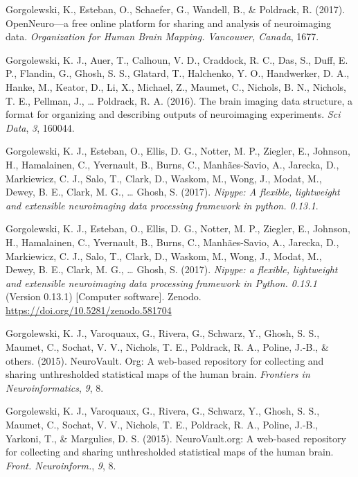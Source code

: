\documentclass[11pt,american,a4paper,oneside,]{memoir} %
\begin{document}
\leavevmode\hypertarget{ref-Gorgolewski2017-uu}{}%
Gorgolewski, K., Esteban, O., Schaefer, G., Wandell, B., \& Poldrack, R. (2017). OpenNeuro---a free online platform for sharing and analysis of neuroimaging data. \emph{Organization for Human Brain Mapping. Vancouver, Canada}, 1677.

\leavevmode\hypertarget{ref-Gorgolewski2016-in}{}%
Gorgolewski, K. J., Auer, T., Calhoun, V. D., Craddock, R. C., Das, S., Duff, E. P., Flandin, G., Ghosh, S. S., Glatard, T., Halchenko, Y. O., Handwerker, D. A., Hanke, M., Keator, D., Li, X., Michael, Z., Maumet, C., Nichols, B. N., Nichols, T. E., Pellman, J., \ldots{} Poldrack, R. A. (2016). The brain imaging data structure, a format for organizing and describing outputs of neuroimaging experiments. \emph{Sci Data}, \emph{3}, 160044.

\leavevmode\hypertarget{ref-Gorgolewski2017-gb}{}%
Gorgolewski, K. J., Esteban, O., Ellis, D. G., Notter, M. P., Ziegler, E., Johnson, H., Hamalainen, C., Yvernault, B., Burns, C., Manhães-Savio, A., Jarecka, D., Markiewicz, C. J., Salo, T., Clark, D., Waskom, M., Wong, J., Modat, M., Dewey, B. E., Clark, M. G., \ldots{} Ghosh, S. (2017). \emph{Nipype: A flexible, lightweight and extensible neuroimaging data processing framework in python. 0.13.1}.

\leavevmode\hypertarget{ref-gorgolewski_krzysztof_j_2017_581704}{}%
Gorgolewski, K. J., Esteban, O., Ellis, D. G., Notter, M. P., Ziegler, E., Johnson, H., Hamalainen, C., Yvernault, B., Burns, C., Manhães-Savio, A., Jarecka, D., Markiewicz, C. J., Salo, T., Clark, D., Waskom, M., Wong, J., Modat, M., Dewey, B. E., Clark, M. G., \ldots{} Ghosh, S. (2017). \emph{Nipype: a flexible, lightweight and extensible neuroimaging data processing framework in Python. 0.13.1} (Version 0.13.1) {[}Computer software{]}. Zenodo. \url{https://doi.org/10.5281/zenodo.581704}

\leavevmode\hypertarget{ref-gorgolewski2015neurovault}{}%
Gorgolewski, K. J., Varoquaux, G., Rivera, G., Schwarz, Y., Ghosh, S. S., Maumet, C., Sochat, V. V., Nichols, T. E., Poldrack, R. A., Poline, J.-B., \& others. (2015). NeuroVault. Org: A web-based repository for collecting and sharing unthresholded statistical maps of the human brain. \emph{Frontiers in Neuroinformatics}, \emph{9}, 8.

\leavevmode\hypertarget{ref-Gorgolewski2015-hj}{}%
Gorgolewski, K. J., Varoquaux, G., Rivera, G., Schwarz, Y., Ghosh, S. S., Maumet, C., Sochat, V. V., Nichols, T. E., Poldrack, R. A., Poline, J.-B., Yarkoni, T., \& Margulies, D. S. (2015). NeuroVault.org: A web-based repository for collecting and sharing unthresholded statistical maps of the human brain. \emph{Front. Neuroinform.}, \emph{9}, 8.
\end{document}
